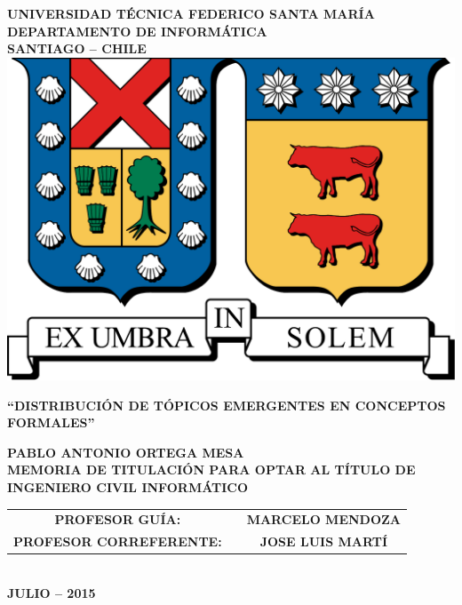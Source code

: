 \documentclass[12pt,oneside,letterpaper]{book}
\theoremstyle{definition}
\begin{document}
\begin{titlepage}
\begin{centering}
{
\textbf{\Large UNIVERSIDAD TÉCNICA FEDERICO SANTA MARÍA}\\[0.3em]
\textbf{\small DEPARTAMENTO DE INFORMÁTICA}\\[0.85em]
\textbf{\small SANTIAGO -- CHILE}\\[2.4em]
}
\includegraphics[scale=0.295]{images/logo-utfsm} \\[4em]
\begin{spacing}{1.8}
\textbf{\Large \uppercase{``Distribución de Tópicos Emergentes en Conceptos Formales''}} \\[3.70em]
\end{spacing}
\textbf{\large \uppercase{Pablo Antonio Ortega Mesa}}\\[0.54em]
\textbf{\small MEMORIA DE TITULACIÓN PARA OPTAR AL TÍTULO DE INGENIERO CIVIL INFORMÁTICO} \\[1em]
\begin{tabular}{ccc} \small\bf
\small\bf PROFESOR GUÍA:          & & \small\bf \uppercase{Marcelo Mendoza} \\
\small\bf PROFESOR CORREFERENTE:  & & \small\bf \uppercase{Jose Luis Martí} \\
\end{tabular} \\[2.5em]
\textbf{\small JULIO -- 2015} \\
\end{centering}
\end{titlepage}
\restoregeometry
\end{document}
